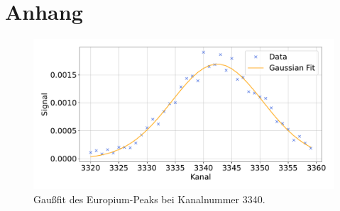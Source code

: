 \section*{Anhang}



\begin{figure}
    \centering
    \includegraphics[width=\textwidth]{../plots/Europium-Peak-3340.pdf}
    \caption{Gaußfit des Europium-Peaks bei Kanalnummer 3340.}
    \label{fig:Europium-Peak-3340}
\end{figure}
